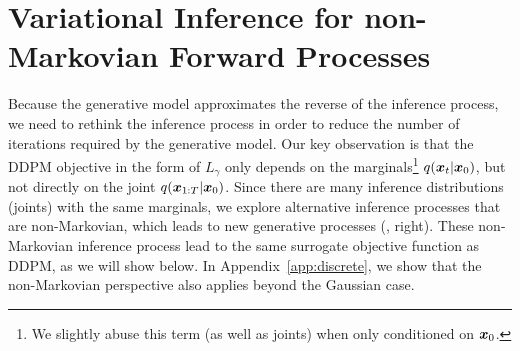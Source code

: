 \section{Variational Inference for non-Markovian Forward Processes}
\label{sec:variational}

Because the generative model approximates the reverse of the inference process, we need to rethink the inference process in order to reduce the number of iterations required by the generative model.
Our key observation is that the DDPM objective in the form of $L_\gamma$ only depends on the marginals\footnote{We slightly abuse this term (as well as joints) when only conditioned on ${\bm{x}}_0$.} $q({\bm{x}}_t | {\bm{x}}_0)$, but not directly on the joint $q({\bm{x}}_{1:T} | {\bm{x}}_{0})$. Since there are many inference distributions (joints) with the same marginals, we 
explore 
alternative
inference processes that are non-Markovian, which leads
to new generative processes (, right). 
These non-Markovian inference process lead to the same surrogate objective function as DDPM, as we will show below.
In Appendix~\ref{app:discrete}, we show that the non-Markovian perspective also applies beyond the Gaussian case.

